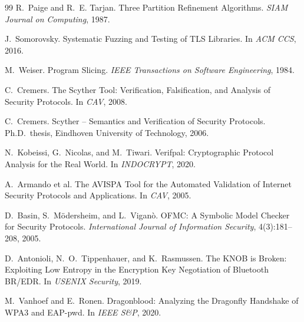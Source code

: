 \documentclass[10pt,twocolumn]{article}
\begin{document}
\begin{thebibliography}{99}
R.~Paige and R.~E. Tarjan.
\newblock Three Partition Refinement Algorithms.
\newblock \emph{SIAM Journal on Computing}, 1987.

J.~Somorovsky.
\newblock Systematic Fuzzing and Testing of TLS Libraries.
\newblock In \emph{ACM CCS}, 2016.

M.~Weiser.
\newblock Program Slicing.
\newblock \emph{IEEE Transactions on Software Engineering}, 1984.

C.~Cremers.
\newblock The Scyther Tool: Verification, Falsification, and Analysis of Security Protocols.
\newblock In \emph{CAV}, 2008.

C.~Cremers.
\newblock Scyther -- Semantics and Verification of Security Protocols.
\newblock Ph.D.\ thesis, Eindhoven University of Technology, 2006.

N.~Kobeissi, G.~Nicolas, and M.~Tiwari.
\newblock Verifpal: Cryptographic Protocol Analysis for the Real World.
\newblock In \emph{INDOCRYPT}, 2020.

A.~Armando et al.
\newblock The AVISPA Tool for the Automated Validation of Internet Security Protocols and Applications.
\newblock In \emph{CAV}, 2005.

D.~Basin, S.~M\"odersheim, and L.~Vigan\`o.
\newblock OFMC: A Symbolic Model Checker for Security Protocols.
\newblock \emph{International Journal of Information Security}, 4(3):181--208, 2005.

D.~Antonioli, N.~O.~Tippenhauer, and K.~Rasmussen.
\newblock The KNOB is Broken: Exploiting Low Entropy in the Encryption Key Negotiation of Bluetooth BR/EDR.
\newblock In \emph{USENIX Security}, 2019.

M.~Vanhoef and E.~Ronen.
\newblock Dragonblood: Analyzing the Dragonfly Handshake of WPA3 and EAP-pwd.
\newblock In \emph{IEEE S\&P}, 2020.

\end{thebibliography}
\end{document}
